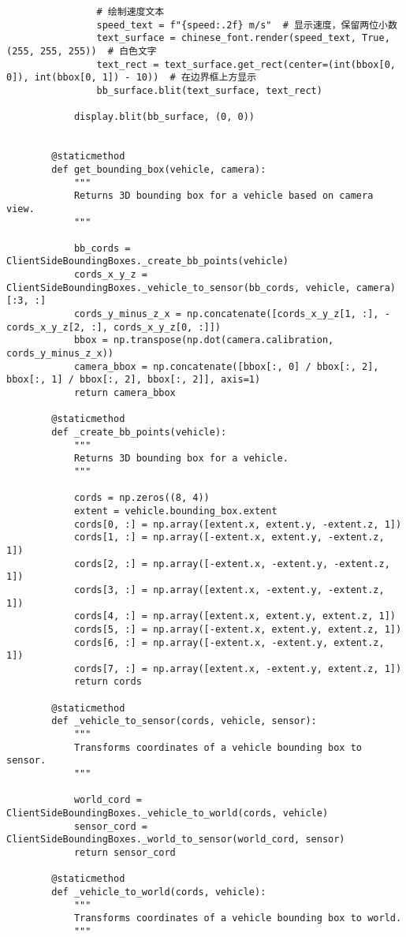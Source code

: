 \begin{lstlisting}
	            # 绘制速度文本
	            speed_text = f"{speed:.2f} m/s"  # 显示速度，保留两位小数
	            text_surface = chinese_font.render(speed_text, True, (255, 255, 255))  # 白色文字
	            text_rect = text_surface.get_rect(center=(int(bbox[0, 0]), int(bbox[0, 1]) - 10))  # 在边界框上方显示
	            bb_surface.blit(text_surface, text_rect)
	        
	        display.blit(bb_surface, (0, 0))
	
	
	    @staticmethod
	    def get_bounding_box(vehicle, camera):
	        """
	        Returns 3D bounding box for a vehicle based on camera view.
	        """
	
	        bb_cords = ClientSideBoundingBoxes._create_bb_points(vehicle)
	        cords_x_y_z = ClientSideBoundingBoxes._vehicle_to_sensor(bb_cords, vehicle, camera)[:3, :]
	        cords_y_minus_z_x = np.concatenate([cords_x_y_z[1, :], -cords_x_y_z[2, :], cords_x_y_z[0, :]])
	        bbox = np.transpose(np.dot(camera.calibration, cords_y_minus_z_x))
	        camera_bbox = np.concatenate([bbox[:, 0] / bbox[:, 2], bbox[:, 1] / bbox[:, 2], bbox[:, 2]], axis=1)
	        return camera_bbox
	
	    @staticmethod
	    def _create_bb_points(vehicle):
	        """
	        Returns 3D bounding box for a vehicle.
	        """
	
	        cords = np.zeros((8, 4))
	        extent = vehicle.bounding_box.extent
	        cords[0, :] = np.array([extent.x, extent.y, -extent.z, 1])
	        cords[1, :] = np.array([-extent.x, extent.y, -extent.z, 1])
	        cords[2, :] = np.array([-extent.x, -extent.y, -extent.z, 1])
	        cords[3, :] = np.array([extent.x, -extent.y, -extent.z, 1])
	        cords[4, :] = np.array([extent.x, extent.y, extent.z, 1])
	        cords[5, :] = np.array([-extent.x, extent.y, extent.z, 1])
	        cords[6, :] = np.array([-extent.x, -extent.y, extent.z, 1])
	        cords[7, :] = np.array([extent.x, -extent.y, extent.z, 1])
	        return cords
	
	    @staticmethod
	    def _vehicle_to_sensor(cords, vehicle, sensor):
	        """
	        Transforms coordinates of a vehicle bounding box to sensor.
	        """
	
	        world_cord = ClientSideBoundingBoxes._vehicle_to_world(cords, vehicle)
	        sensor_cord = ClientSideBoundingBoxes._world_to_sensor(world_cord, sensor)
	        return sensor_cord
	
	    @staticmethod
	    def _vehicle_to_world(cords, vehicle):
	        """
	        Transforms coordinates of a vehicle bounding box to world.
	        """
	

\end{lstlisting}
